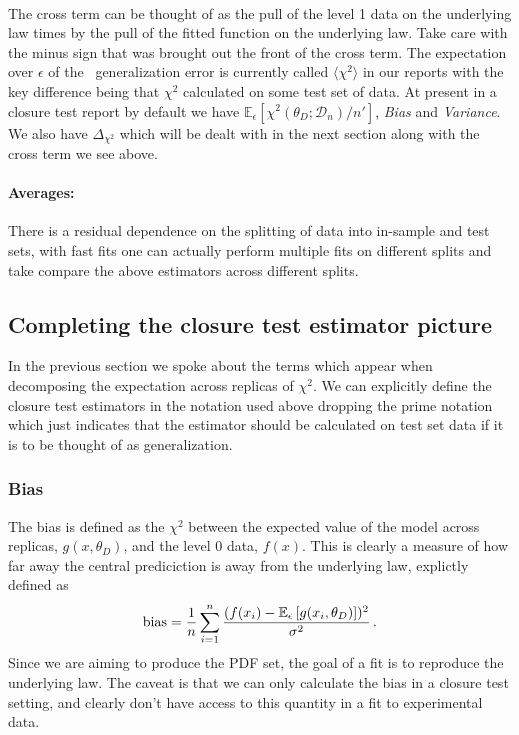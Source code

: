 \paragraph[]{}
The cross term can
be thought of as the pull of the level 1 data on the underlying law times by
the pull of the fitted function on the underlying law. Take care with the minus
sign that was brought out the front of the cross term. The expectation over
$\epsilon$ of the \nnpdf\ generalization error is currently called 
$\langle \chi^2 \rangle$ in our reports with the key difference being that
$\chi^2$ calculated on some test set of data. At present in a closure
test report by default we have
$\mathbb{E}_{\epsilon}\left[\chi^2(\theta_D; \mathcal{D}_{n})/n'\right]$,
{\em Bias} and {\em Variance}. We also have $\Delta_{\chi^2}$ which will be
dealt with in the next section along with the cross term we see above.

\paragraph[]{Averages:} There is a residual dependence
on the splitting of data into in-sample and test sets, with fast fits one can
actually perform multiple fits on different splits and take compare the above
estimators across different splits.

\subsection{Completing the closure test estimator picture}

In the previous section we spoke about the terms which appear when decomposing
the expectation across replicas of $\chi^2$. We can explicitly define the
closure test estimators in the notation used above dropping the prime notation
which just indicates that the estimator should be calculated on test set data
if it is to be thought of as generalization.

\subsubsection*{Bias}

The bias is defined as the $\chi^2$ between the expected value of the model
across replicas, $g(x, \theta_D)$, and the level 0 data,
$f(x)$. This is clearly a measure of how far away the
central prediciction is away from the underlying law, explictly defined as
%
\begin{equation}
    \label{eq:Biasdef}
    \mathrm{bias} = \frac{1}{n} \sum_{i=1}^{n} \frac{(f(x_i) -
    \mathbb{E}_{\epsilon}\left[g(x_i,\theta_D)\right])^2}{\sigma^2} \, .
\end{equation}
%
Since we are aiming to produce the PDF set, the goal of a fit is to reproduce
the underlying law. The caveat is that we can only calculate the bias in a
closure test setting, and clearly don't have access to this quantity in a fit to
experimental data.

